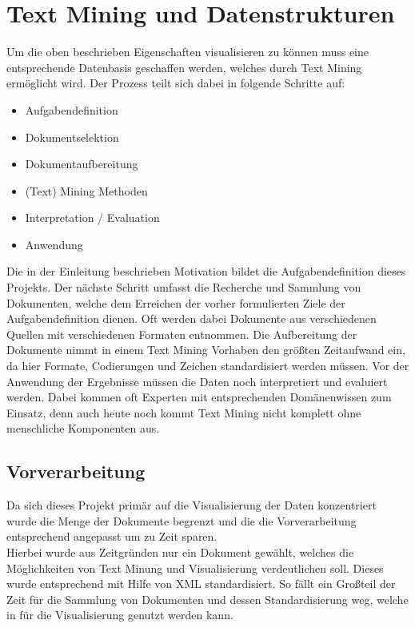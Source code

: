 \section{Text Mining und Datenstrukturen}
Um die oben beschrieben Eigenschaften visualisieren zu können muss eine entsprechende Datenbasis geschaffen werden, welches durch Text Mining ermöglicht wird. Der Prozess teilt sich dabei in folgende Schritte auf:

\begin{itemize}
\item Aufgabendefinition
\item Dokumentselektion
\item Dokumentaufbereitung
\item (Text) Mining Methoden
\item Interpretation / Evaluation
\item Anwendung
\end{itemize}

Die in der Einleitung beschrieben Motivation bildet die Aufgabendefinition dieses Projekts. Der nächste Schritt umfasst die Recherche und Sammlung von Dokumenten, welche dem Erreichen der vorher formulierten Ziele der Aufgabendefinition dienen. Oft werden dabei Dokumente aus verschiedenen Quellen mit verschiedenen Formaten entnommen.  Die Aufbereitung der Dokumente nimmt in einem Text Mining Vorhaben den größten Zeitaufwand ein, da hier Formate, Codierungen und Zeichen standardisiert werden müssen. Vor der Anwendung der Ergebnisse müssen die Daten noch interpretiert und evaluiert werden. Dabei kommen oft Experten mit entsprechenden Domänenwissen zum Einsatz, denn auch heute noch kommt Text Mining nicht komplett ohne menschliche Komponenten aus.

\subsection{Vorverarbeitung}
Da sich dieses Projekt primär auf die Visualisierung der Daten konzentriert wurde die Menge der Dokumente begrenzt und die die Vorverarbeitung entsprechend angepasst um zu Zeit sparen. \\

Hierbei wurde aus Zeitgründen nur ein Dokument gewählt, welches die Möglichkeiten von Text Minung und Visualisierung verdeutlichen soll. Dieses wurde entsprechend mit Hilfe von XML standardisiert. So fällt ein Großteil der Zeit für die Sammlung von Dokumenten und dessen Standardisierung weg, welche in für die Visualisierung genutzt werden kann. \\


